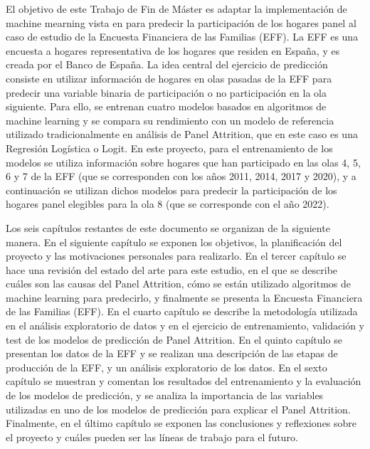 El objetivo de este Trabajo de Fin de Máster es adaptar la implementación de machine mearning vista en \cite{beste2023case} para predecir la participación de los hogares panel al caso de estudio de la Encuesta Financiera de las Familias (EFF). La EFF es una encuesta a hogares representativa de los hogares que residen en España, y es creada por el Banco de España. La idea central del ejercicio de predicción consiste en utilizar información de hogares en olas pasadas de la EFF para predecir una variable binaria de participación o no participación en la ola siguiente. Para ello, se entrenan cuatro modelos basados en algoritmos de machine learning y se compara su rendimiento con un modelo de referencia utilizado tradicionalmente en análisis de Panel Attrition, que en este caso es una Regresión Logística o Logit. En este proyecto, para el entrenamiento de los modelos se utiliza información sobre hogares que han participado en las olas 4, 5, 6 y 7 de la EFF (que se corresponden con los años 2011, 2014, 2017 y 2020), y a continuación se utilizan dichos modelos para predecir la participación de los hogares panel elegibles para la ola 8 (que se corresponde con el año 2022).

Los seis capítulos restantes de este documento se organizan de la siguiente manera. En el siguiente capítulo se exponen los objetivos, la planificación del proyecto y las motivaciones personales para realizarlo. En el tercer capítulo se hace una revisión del estado del arte para este estudio, en el que se describe cuáles son las causas del Panel Attrition, cómo se están utilizado algoritmos de machine learning para predecirlo, y finalmente se presenta la Encuesta Financiera de las Familias (EFF). En el cuarto capítulo se describe la metodología utilizada en el análisis exploratorio de datos y en el ejercicio de entrenamiento, validación y test de los modelos de predicción de Panel Attrition. En el quinto capítulo se presentan los datos de la EFF y se realizan una descripción de las etapas de producción de la EFF, y un análisis exploratorio de los datos. En el sexto capítulo se muestran y comentan los resultados del entrenamiento y la evaluación de los modelos de predicción, y se analiza la importancia de las variables utilizadas en uno de los modelos de predicción para explicar el Panel Attrition. Finalmente, en el último capítulo se exponen las conclusiones y reflexiones sobre el proyecto y cuáles pueden ser las líneas de trabajo para el futuro.